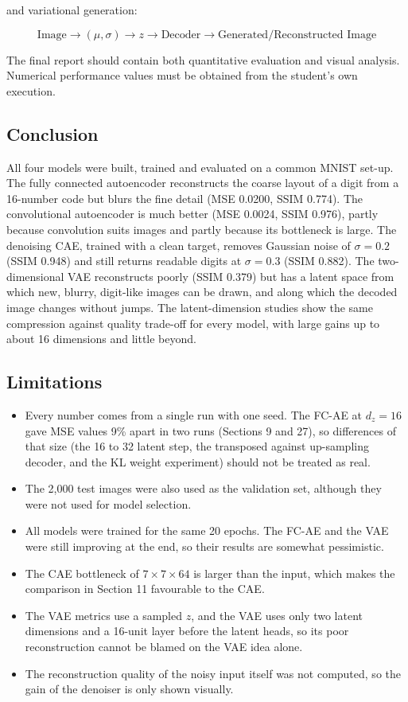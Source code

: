 \documentclass[10pt]{article}
\begin{document}
and variational generation:

\[
\boxed{
\text{Image}
\rightarrow
(\mu,\sigma)
\rightarrow
z
\rightarrow
\text{Decoder}
\rightarrow
\text{Generated/Reconstructed Image}
}
\]

The final report should contain both quantitative evaluation and visual
analysis. Numerical performance values must be obtained from the student's
own execution.

\subsection*{Conclusion}

All four models were built, trained and evaluated on a common MNIST set-up. The
fully connected autoencoder reconstructs the coarse layout of a digit from a
16-number code but blurs the fine detail (MSE 0.0200, SSIM 0.774). The
convolutional autoencoder is much better (MSE 0.0024, SSIM 0.976), partly because
convolution suits images and partly because its bottleneck is large. The denoising
CAE, trained with a clean target, removes Gaussian noise of $\sigma=0.2$ (SSIM
0.948) and still returns readable digits at $\sigma=0.3$ (SSIM 0.882). The
two-dimensional VAE reconstructs poorly (SSIM 0.379) but has a latent space
from which new, blurry, digit-like images can be drawn, and along which the
decoded image changes without jumps. The latent-dimension studies show the
same compression against quality trade-off for every model, with large gains
up to about 16 dimensions and little beyond.

\subsection*{Limitations}

\begin{itemize}
\item Every number comes from a single run with one seed. The FC-AE at
$d_z=16$ gave MSE values 9\% apart in two runs (Sections 9 and 27), so
differences of that size (the 16 to 32 latent step, the transposed against
up-sampling decoder, and the KL weight experiment) should not be treated as real.
\item The 2,000 test images were also used as the validation set, although they
were not used for model selection.
\item All models were trained for the same 20 epochs. The FC-AE and the VAE were
still improving at the end, so their results are somewhat pessimistic.
\item The CAE bottleneck of $7\times7\times64$ is larger than the input, which
makes the comparison in Section 11 favourable to the CAE.
\item The VAE metrics use a sampled $z$, and the VAE uses only two latent
dimensions and a 16-unit layer before the latent heads, so its poor
reconstruction cannot be blamed on the VAE idea alone.
\item The reconstruction quality of the noisy input itself was not computed, so the
gain of the denoiser is only shown visually.
\end{itemize}
\end{document}
